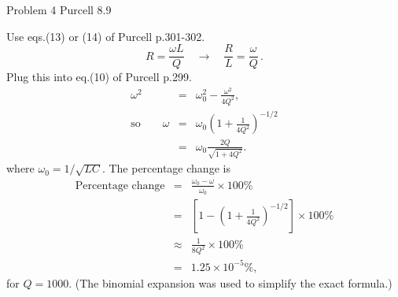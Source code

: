 \documentclass[makesolutionspdf]{esg8022pset}
\begin{document}
\begin{problem}{Problem 4 Purcell 8.9}
\end{problem}
\begin{solution}
Use eqs.(13) or (14) of Purcell p.301-302.
\begin{equation}
R=\frac{\omega L}{Q} \quad\to\quad \frac{R}{L}=\frac{\omega}{Q}\,.
\end{equation}
Plug this into eq.(10) of Purcell p.299.
\begin{eqnarray}
\omega^2 &=& \omega_0^2-\frac{\omega^2}{4Q^2},\\
\textrm{so} \qquad \omega &=& \omega_0 \left(1+\frac{1}{4Q^2}\right)^{-1/2}\\
&=& \omega_0\frac{2Q}{\sqrt{1+4Q^2}}.
\end{eqnarray}
where $\omega_0=1/\sqrt{LC}$.  The percentage change is
\begin{eqnarray}
\textrm{Percentage change} &=& \frac{\omega_0-\omega}{\omega_0}\times
100\%\nonumber\\
&=& \left[1-\left(1+\frac{1}{4Q^2}\right)^{-1/2}\right]\times 100\%\nonumber\\
&\approx & \frac{1}{8Q^2}\times 100\%\nonumber\\
&=& 1.25\times 10^{-5} \%,
\end{eqnarray}
for $Q=1000$.  (The binomial expansion was used to simplify the exact formula.)

\end{solution}
\end{document}

